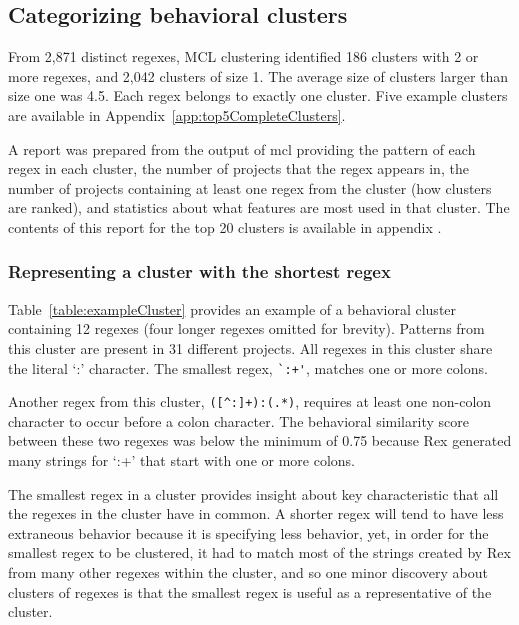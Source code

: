 \subsection{Categorizing behavioral clusters}
From 2,871 distinct regexes, MCL clustering identified 186 clusters with 2 or more regexes, and 2,042 clusters of size 1.
The average size of clusters larger than size one was 4.5.  Each regex belongs to exactly one cluster.  Five example clusters are available in Appendix~\ref{app:top5CompleteClusters}.

A report was prepared from the output of mcl providing the pattern of each regex in each cluster, the number of projects that the regex appears in, the number of projects containing at least one regex from the cluster (how clusters are ranked), and statistics about what features are most used in that cluster.  The contents of this report for the top 20 clusters is available in appendix .


\subsubsection{Representing a cluster with the shortest regex}
Table~\ref{table:exampleCluster} provides an example of a behavioral cluster containing 12 regexes (four longer regexes omitted for brevity). Patterns from this cluster are present in 31 different projects.  All regexes in this cluster share the literal `:' character. The smallest regex, \verb!`:+'!,  matches one or more colons.


Another regex from this cluster, \verb!([^:]+):(.*)!, requires at least one non-colon character to occur before a colon character.  The behavioral similarity score between these two regexes was below the minimum of 0.75 because Rex generated many strings for `:+' that start with one or more colons.

The smallest regex in a cluster provides insight about key characteristic that all the regexes in the cluster have in common.  A shorter regex will tend to have less extraneous behavior because it is specifying less behavior,
yet, in order for the smallest regex to be clustered, it had to match most of the strings created by Rex from many other regexes within the cluster, and so one minor discovery about clusters of regexes is that {the smallest regex is useful as a representative of the cluster}.

